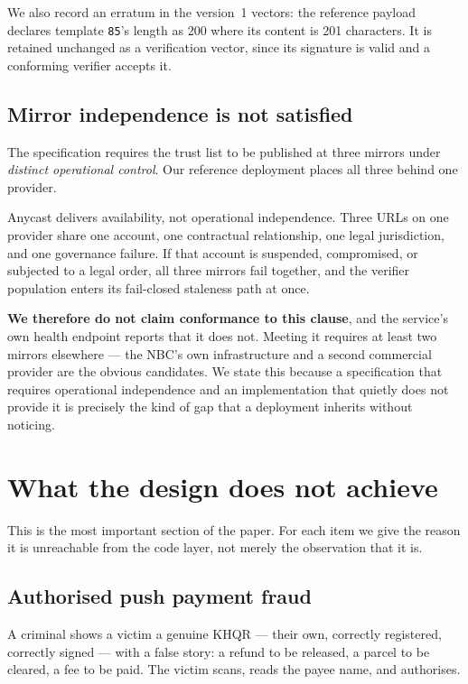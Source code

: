 \documentclass[10pt,a4paper,twocolumn]{article}
\newcommand{\code}[1]{\texttt{\small #1}}
\begin{document}
We also record an erratum in the version~1 vectors: the reference payload
declares template \code{85}'s length as 200 where its content is 201
characters. It is retained unchanged as a verification vector, since its
signature is valid and a conforming verifier accepts it.

\subsection{Mirror independence is not satisfied}
\label{sec:mirrors}

The specification requires the trust list to be published at three mirrors under
\emph{distinct operational control}. Our reference deployment places all three
behind one provider.

Anycast delivers availability, not operational independence. Three URLs on one
provider share one account, one contractual relationship, one legal
jurisdiction, and one governance failure. If that account is suspended,
compromised, or subjected to a legal order, all three mirrors fail together, and
the verifier population enters its fail-closed staleness path at once.

\textbf{We therefore do not claim conformance to this clause}, and the service's
own health endpoint reports that it does not. Meeting it requires at least two
mirrors elsewhere --- the NBC's own infrastructure and a second commercial
provider are the obvious candidates. We state this because a specification that
requires operational independence and an implementation that quietly does not
provide it is precisely the kind of gap that a deployment inherits without
noticing.

\section{What the design does not achieve}
\label{sec:notachieved}

This is the most important section of the paper. For each item we give the
reason it is unreachable from the code layer, not merely the observation that it
is.

\subsection{Authorised push payment fraud}
\label{sec:app}

A criminal shows a victim a genuine KHQR --- their own, correctly registered,
correctly signed --- with a false story: a refund to be released, a parcel to be
cleared, a fee to be paid. The victim scans, reads the payee name, and
authorises.
\end{document}
